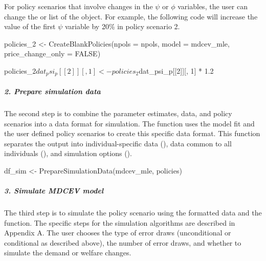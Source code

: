 For policy scenarios that involve changes in the \(\psi\) or \(\phi\)
variables, the user can change the  or 
list of the  object. For example, the following code will
increase the value of the first \(\psi\) variable by 20\% in policy
scenario 2.

\begin{example}
policies_2 <-  CreateBlankPolicies(npols = npols,
                                model = mdcev_mle,
                                price_change_only = FALSE)

policies_2$dat_psi_p[[2]][, 1] <- policies_2$dat_psi_p[[2]][, 1] * 1.2
\end{example}

\hypertarget{prepare-simulation-data}{%
\subparagraph{2. Prepare simulation
data}\label{prepare-simulation-data}}

The second step is to combine the parameter estimates, data, and policy
scenarios into a data format for simulation. The
 function uses the model fit and the user
defined policy scenarios to create this specific data format. This
function separates the output into individual-specific data
(), data common to all individuals (),
and simulation options ().

\begin{example}
df_sim <- PrepareSimulationData(mdcev_mle, policies)
\end{example}

\hypertarget{simulate-mdcev-model}{%
\subparagraph{3. Simulate MDCEV model}\label{simulate-mdcev-model}}

The third step is to simulate the policy scenario using the formatted
data and the  function. The specific steps for the
simulation algorithms are described in Appendix A. The user chooses the
type of error draws (unconditional or conditional as described above),
the number of error draws, and whether to simulate the demand or welfare
changes.


